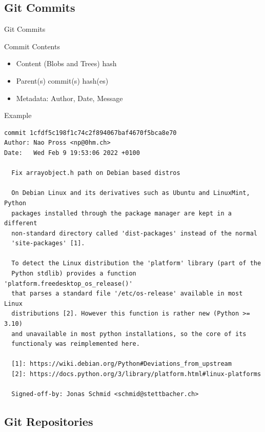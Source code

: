 \documentclass[xetex]{beamer}
\begin{document}
\subsection{Git Commits}

\begin{frame}[fragile]{Git Commits}
  \begin{block}{Commit Contents}
    \begin{itemize}
      \item Content (Blobs and Trees) hash 
      \item Parent(s) commit(s) hash(es)
      \item Metadata: Author, Date, Message
    \end{itemize}
  \end{block}
  \begin{exampleblock}{Example}
  \centering\scriptsize
\begin{verbatim}
commit 1cfdf5c198f1c74c2f894067baf4670f5bca8e70
Author: Nao Pross <np@0hm.ch>
Date:   Wed Feb 9 19:53:06 2022 +0100

  Fix arrayobject.h path on Debian based distros
  
  On Debian Linux and its derivatives such as Ubuntu and LinuxMint, Python
  packages installed through the package manager are kept in a different
  non-standard directory called 'dist-packages' instead of the normal
  'site-packages' [1].
  
  To detect the Linux distribution the 'platform' library (part of the
  Python stdlib) provides a function 'platform.freedesktop_os_release()'
  that parses a standard file '/etc/os-release' available in most Linux
  distributions [2]. However this function is rather new (Python >= 3.10)
  and unavailable in most python installations, so the core of its
  functionaly was reimplemented here.
  
  [1]: https://wiki.debian.org/Python#Deviations_from_upstream
  [2]: https://docs.python.org/3/library/platform.html#linux-platforms
  
  Signed-off-by: Jonas Schmid <schmid@stettbacher.ch>
\end{verbatim}
  \end{exampleblock}
\end{frame}

\subsection{Git Repositories}
\end{document}
